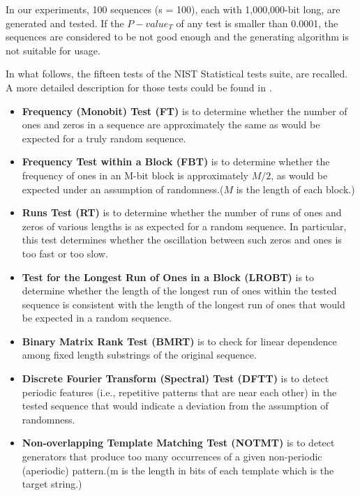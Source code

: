 In our experiments, 100 sequences (s = 100), each with 1,000,000-bit long, are generated and tested. If the $P-value_{T}$ of any test is smaller than 0.0001, the sequences are considered to be not good enough and the generating algorithm is not suitable for usage.

In what follows, the fifteen tests of the NIST Statistical tests suite, are recalled. A more detailed description for those tests could be found in \cite{ANDREW2008}.
\begin{itemize}
\item \textbf{Frequency (Monobit) Test (FT)} is to determine whether the number of ones and zeros in a sequence are approximately the same as would be expected for a truly random sequence.


\item \textbf{Frequency Test within a Block (FBT)} is to determine whether the frequency of ones in an M-bit block is approximately $M/2$, as would be expected under an assumption of randomness.($M$ is the length of each block.)


\item \textbf{Runs Test (RT)} is to determine whether the number of runs of ones and zeros of various lengths is as expected for a random sequence. In particular, this test determines whether the oscillation between such zeros and ones is too fast or too slow.


\item \textbf{Test for the Longest Run of Ones in a Block (LROBT)} is to determine whether the length of the longest run of ones within the tested sequence is consistent with the length of the longest run of ones that would be expected in a random sequence.


\item \textbf{Binary Matrix Rank Test (BMRT)} is to check for linear dependence among fixed length substrings of the original sequence.


\item \textbf{Discrete Fourier Transform (Spectral) Test (DFTT)} is to detect periodic features (i.e., repetitive patterns that are near each other) in the tested sequence that would indicate a deviation from the assumption of randomness.


\item \textbf{Non-overlapping Template Matching Test (NOTMT)} is to detect generators that produce too many occurrences of a given non-periodic (aperiodic) pattern.(m is the length in bits of each template which is the target string.)



\end{itemize}
